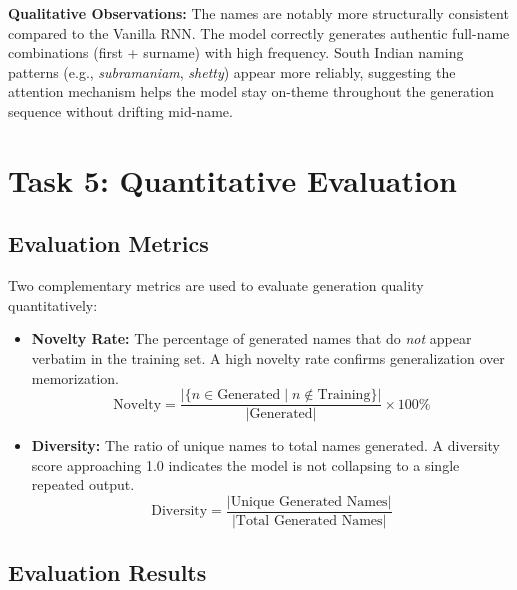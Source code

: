 \documentclass[11pt,a4paper]{article}
\begin{document}
\vspace{0.5em}
\textbf{Qualitative Observations:} The names are notably more structurally consistent compared to the Vanilla RNN. The model correctly generates authentic full-name combinations (first + surname) with high frequency. South Indian naming patterns (e.g., \textit{subramaniam}, \textit{shetty}) appear more reliably, suggesting the attention mechanism helps the model stay on-theme throughout the generation sequence without drifting mid-name.

\clearpage
\section{Task 5: Quantitative Evaluation}

\subsection{Evaluation Metrics}
Two complementary metrics are used to evaluate generation quality quantitatively:

\begin{itemize}[label=\textcolor{iitjblue}{\textbullet}, itemsep=0.5em]
    \justifying
    \item \textbf{Novelty Rate:} The percentage of generated names that do \textit{not} appear verbatim in the training set. A high novelty rate confirms generalization over memorization.
    \[ \text{Novelty} = \frac{|\{n \in \text{Generated} \mid n \notin \text{Training}\}|}{|\text{Generated}|} \times 100\% \]
    \item \textbf{Diversity:} The ratio of unique names to total names generated. A diversity score approaching 1.0 indicates the model is not collapsing to a single repeated output.
    \[ \text{Diversity} = \frac{|\text{Unique Generated Names}|}{|\text{Total Generated Names}|} \]
\end{itemize}

\subsection{Evaluation Results}
\end{document}
